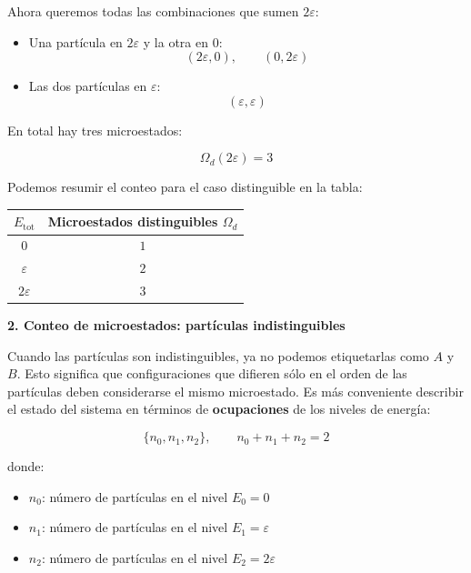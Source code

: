 \documentclass{article}
\begin{document}
Ahora queremos todas las combinaciones que sumen \(2\varepsilon\):

\begin{itemize}
  \item Una partícula en \(2\varepsilon\) y la otra en \(0\):
  \[
  (2\varepsilon,0),\qquad (0,2\varepsilon)
  \]
  \item Las dos partículas en \(\varepsilon\):
  \[
  (\varepsilon,\varepsilon)
  \]
\end{itemize}

En total hay tres microestados:

\[
\boxed{\Omega_{d}(2\varepsilon) = 3}
\]

Podemos resumir el conteo para el caso distinguible en la tabla:

\begin{center}
\begin{tabular}{c|c}
\hline
\(E_{\mathrm{tot}}\) & Microestados distinguibles \(\Omega_{d}\) \\
\hline
\(0\)           & \(1\) \\
\(\varepsilon\) & \(2\) \\
\(2\varepsilon\)& \(3\) \\
\hline
\end{tabular}
\end{center}


\textcolor{Apple Green}{\textbf{2. Conteo de microestados: partículas indistinguibles}}

Cuando las partículas son indistinguibles, ya no podemos etiquetarlas como
\(A\) y \(B\). Esto significa que configuraciones que difieren sólo en el
orden de las partículas deben considerarse el mismo microestado.  
Es más conveniente describir el estado del sistema en términos de \textbf{ocupaciones}
de los niveles de energía:

\[
\{n_{0},n_{1},n_{2}\},\qquad n_{0}+n_{1}+n_{2}=2
\]

donde:
\begin{itemize}
  \item \(n_{0}\): número de partículas en el nivel \(E_{0}=0\)
  \item \(n_{1}\): número de partículas en el nivel \(E_{1}=\varepsilon\)
  \item \(n_{2}\): número de partículas en el nivel \(E_{2}=2\varepsilon\)
\end{itemize}
\end{document}
